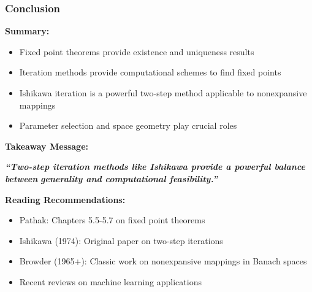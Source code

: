 \documentclass[aspectratio=169,10pt]{beamer}
\begin{document}
\begin{frame}
\frametitle{Conclusion}

\textbf{Summary:}
\begin{itemize}
    \item Fixed point theorems provide existence and uniqueness results
    \item Iteration methods provide computational schemes to find fixed points
    \item Ishikawa iteration is a powerful two-step method applicable to nonexpansive mappings
    \item Parameter selection and space geometry play crucial roles
\end{itemize}

\vspace{0.4cm}

\textbf{Takeaway Message:}

\Large
\centering
\textbf{\textit{``Two-step iteration methods like Ishikawa provide a powerful balance between}}
\textbf{\textit{generality and computational feasibility.''}}

\vspace{0.4cm}

\normalsize
\raggedright

\textbf{Reading Recommendations:}
\begin{itemize}
    \item Pathak: Chapters 5.5-5.7 on fixed point theorems
    \item Ishikawa (1974): Original paper on two-step iterations
    \item Browder (1965+): Classic work on nonexpansive mappings in Banach spaces
    \item Recent reviews on machine learning applications
\end{itemize}

\end{frame}
\end{document}

